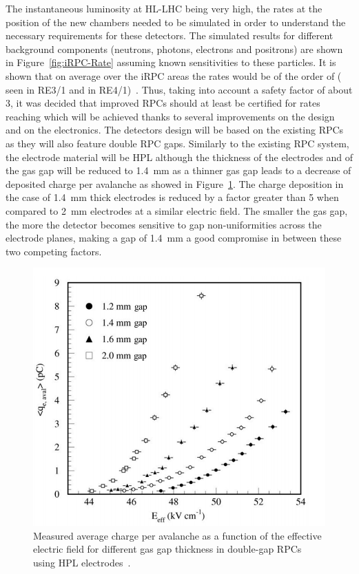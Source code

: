 	The instantaneous luminosity at HL-LHC being very high, the rates at the position of the new chambers needed to be simulated in order to understand the necessary requirements for these detectors. The simulated results for different background components (neutrons, photons, electrons and positrons) are shown in Figure~\ref{fig:iRPC-Rate} assuming known sensitivities to these particles. It is shown that on average over the iRPC areas the rates would be of the order of  ( seen in RE3/1 and  in RE4/1)~\cite{ANDREA2018,ANDREA2018PROC}. Thus, taking into account a safety factor of about 3, it was decided that improved RPCs should at least be certified for rates reaching  which will be achieved thanks to several improvements on the design and on the electronics. The detectors design will be based on the existing RPCs as they will also feature double RPC gaps. Similarly to the existing RPC system, the electrode material will be HPL although the thickness of the electrodes and of the gas gap will be reduced to \SI{1.4}{mm} as a thinner gas gap leads to a decrease of deposited charge per avalanche as showed in Figure~\ref{fig:charge-gap}. The charge deposition in the case of \SI{1.4}{mm} thick electrodes is reduced by a factor greater than 5 when compared to \SI{2}{mm} electrodes at a similar electric field. The smaller the gas gap, the more the detector becomes sensitive to gap non-uniformities across the electrode planes, making a gap of \SI{1.4}{mm} a good compromise in between these two competing factors.

\begingroup\setlength{\intextsep}{0pt}\setlength{\columnsep}{15pt}

	\begin{figure}
		\centering
		\includegraphics[width=\linewidth]{fig/chapt4/charge-vs-gap.png}
		\caption{\label{fig:charge-gap} Measured average charge per avalanche as a function of the effective electric field for different gas gap thickness in double-gap RPCs using HPL electrodes~\cite{PHASEIITP}.}
	\end{figure}
	
